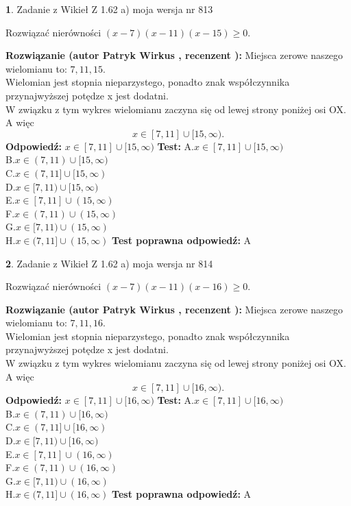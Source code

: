 \documentclass[12pt, a4paper]{article}
\theoremstyle{definition} %
\newtheorem{zad}{}
\newcommand{\zadStart}[1]{\begin{zad}#1\newline}
\newcommand{\zadStop}{\end{zad}}
\newcommand{\rozwStart}[2]{\noindent \textbf{Rozwiązanie (autor #1 , recenzent #2): }\newline}
\newcommand{\rozwStop}{\newline}
\newcommand{\odpStart}{\noindent \textbf{Odpowiedź:}\newline}
\newcommand{\odpStop}{\newline}
\newcommand{\testStart}{\noindent \textbf{Test:}\newline}
\newcommand{\testStop}{\newline}
\newcommand{\kluczStart}{\noindent \textbf{Test poprawna odpowiedź:}\newline}
\newcommand{\kluczStop}{\newline}
\begin{document}
\zadStart{Zadanie z Wikieł Z 1.62 a) moja wersja nr 813}

Rozwiązać nierówności $(x-7)(x-11)(x-15)\ge0$.
\zadStop
\rozwStart{Patryk Wirkus}{}
Miejsca zerowe naszego wielomianu to: $7, 11, 15$.\\
Wielomian jest stopnia nieparzystego, ponadto znak współczynnika przy\linebreak najwyższej potędze x jest dodatni.\\ W związku z tym wykres wielomianu zaczyna się od lewej strony poniżej osi OX. A więc $$x \in [7,11] \cup [15,\infty).$$
\rozwStop
\odpStart
$x \in [7,11] \cup [15,\infty)$
\odpStop
\testStart
A.$x \in [7,11] \cup [15,\infty)$\\
B.$x \in (7,11) \cup [15,\infty)$\\
C.$x \in (7,11] \cup [15,\infty)$\\
D.$x \in [7,11) \cup [15,\infty)$\\
E.$x \in [7,11] \cup (15,\infty)$\\
F.$x \in (7,11) \cup (15,\infty)$\\
G.$x \in [7,11) \cup (15,\infty)$\\
H.$x \in (7,11] \cup (15,\infty)$
\testStop
\kluczStart
A
\kluczStop



\zadStart{Zadanie z Wikieł Z 1.62 a) moja wersja nr 814}

Rozwiązać nierówności $(x-7)(x-11)(x-16)\ge0$.
\zadStop
\rozwStart{Patryk Wirkus}{}
Miejsca zerowe naszego wielomianu to: $7, 11, 16$.\\
Wielomian jest stopnia nieparzystego, ponadto znak współczynnika przy\linebreak najwyższej potędze x jest dodatni.\\ W związku z tym wykres wielomianu zaczyna się od lewej strony poniżej osi OX. A więc $$x \in [7,11] \cup [16,\infty).$$
\rozwStop
\odpStart
$x \in [7,11] \cup [16,\infty)$
\odpStop
\testStart
A.$x \in [7,11] \cup [16,\infty)$\\
B.$x \in (7,11) \cup [16,\infty)$\\
C.$x \in (7,11] \cup [16,\infty)$\\
D.$x \in [7,11) \cup [16,\infty)$\\
E.$x \in [7,11] \cup (16,\infty)$\\
F.$x \in (7,11) \cup (16,\infty)$\\
G.$x \in [7,11) \cup (16,\infty)$\\
H.$x \in (7,11] \cup (16,\infty)$
\testStop
\kluczStart
A
\kluczStop
\end{document}
